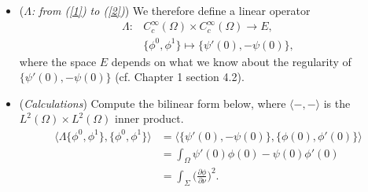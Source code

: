 \begin{itemize}
This is a non-homogeneous boundary value problem, 
which also admits a weak solution $\psi$. 
In terms of this result, \cite{L2} directs us to \cite{LM}.
\item (\textit{$\Lambda$: from (\ref{1}) to (\ref{2})}) 
We therefore define a linear operator
\begin{align*}
    \Lambda\colon & C_c^\infty(\Omega) \times C_c^\infty(\Omega) \to E,\\
    & \{\phi^0,\phi^1\} \mapsto \{\psi'(0),-\psi(0)\},
\end{align*}
where the space $E$ depends on what we know about 
the regularity of $\{\psi'(0),-\psi(0)\}$ 
(cf. \cite{L1} Chapter 1 section 4.2).
\item (\textit{Calculations}) Compute the bilinear form below, 
where $\langle-,-\rangle$ is the $L^2(\Omega) \times L^2(\Omega)$ inner product.
\begin{equation}\label{3}\begin{aligned}
    \langle\Lambda\{\phi^0,\phi^1\},\{\phi^0,\phi^1\}\rangle
    &=\langle\{\psi'(0),-\psi(0)\},\{\phi(0),\phi'(0)\}\rangle\\
    &=\int_\Omega \psi'(0)\phi(0)-\psi(0)\phi'(0)\\
    &=\int_\Sigma \bigg(\frac{\partial\phi}{\partial\nu}\bigg)^2.
\end{aligned}\end{equation}
\begin{proofc}


\end{proofc}
\end{itemize}
